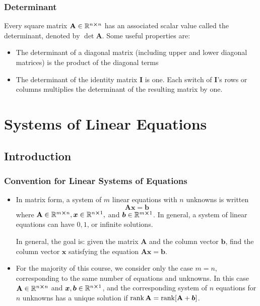 \documentclass[11pt, a4paper]{article}
\newcommand{\R}{\mathbb{R}} %
\newcommand{\mat}[1]{\mathbf{#1}} %
\begin{document}
\subsubsection{Determinant}
Every square matrix $ \mat{A} \in \R^{n \cross n} $ has an associated scalar value called the determinant, denoted by $ \det \mat{A} $. Some useful properties are:
\begin{itemize}
	\item The determinant of a diagonal matrix (including upper and lower diagonal matrices) is the product of the diagonal terms
	
	\item The determinant of the identity matrix $ \mathbf{I} $ is one. Each switch of $ \mathbf{I} $'s rows or columns multiplies the determinant of the resulting matrix by one.
\end{itemize}

\newpage

\section{Systems of Linear Equations}

\subsection{Introduction}

\subsubsection{Convention for Linear Systems of Equations}
\begin{itemize}
	\item In matrix form, a system of $ m $ linear equations with $ n $ unknowns is written
	\begin{equation*}
		\mat{A} \bm{x} = \bm{b}
	\end{equation*}
	where $ \mat{A} \in \R^{m \cross n}, \bm{x} \in \R^{n \cross 1}, $ and  $\bm{b} \in \R^{m \cross 1} $. In general, a system of linear equations can have $ 0, 1 $, or infinite solutions.
		
	In general, the goal is: given the matrix $ \mat{A} $ and the column vector $ \bm{b} $, find the column vector $ \bm{x} $ satisfying the equation $ \mat{A} \bm{x} = \bm{b} $.

	
	\item For the majority of this course, we consider only the case $ m = n $, corresponding to the same number of equations and unknowns. In this case $ \mat{A} \in \R^{n \cross n} $ and $ \bm{x}, \bm{b} \in \R^{n \cross 1}$, and the corresponding system of $ n $ equations for $ n $ unknowns has a unique solution if  $ \rank \mat{A} = \rank[\mat{A} + \bm{b}] $.
	
\end{itemize}
\end{document}
